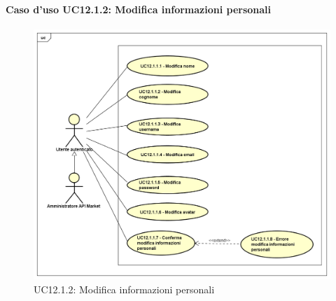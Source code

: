 \newpage
\paragraph{Caso d'uso UC12.1.2: Modifica informazioni personali}
\label{UC12_1_2}
\begin{figure}[ht]
	\centering
	\includegraphics[scale=0.45]{UML/UC12_1_2.png}
	\caption{UC12.1.2: Modifica informazioni personali}
\end{figure}


